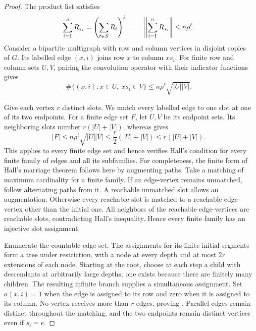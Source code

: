 \begin{proof}
The product list satisfies
\[
 \sum_{i=1}^nR_{s_i}=\left(\sum_{t\in S}R_t\right)^\ell,
 \qquad
 \left\lVert\sum_{i=1}^nR_{s_i}\right\rVert\le n\rho^\ell.
\]
Consider a bipartite multigraph with row and column vertices in
disjoint copies of \(G\). Its labelled edge \((x,i)\) joins row \(x\)
to column \(xs_i\). For finite row and column sets \(U,V\), pairing
the convolution operator with their indicator functions gives
\begin{equation}\label{eq:edge-count}
 \#\{(x,i):x\in U,\ xs_i\in V\}
 \le n\rho^\ell\sqrt{|U||V|}.
\end{equation}

Give each vertex \(r\) distinct slots. We match every labelled edge to
one slot at one of its two endpoints. For a finite edge set \(F\), let
\(U,V\) be its endpoint sets. Its neighboring slots number
\(r(|U|+|V|)\), whereas  gives
\[
 |F|\le n\rho^\ell\sqrt{|U||V|}
 \le\frac r2(|U|+|V|)\le r(|U|+|V|).
\]
This applies to every finite edge set and hence verifies Hall's
condition for every finite family of edges and all its subfamilies.
For completeness, the finite form of Hall's marriage theorem
\cite{Hall1935} follows here by augmenting paths. Take a matching of maximum
cardinality for a finite family. If an edge-vertex remains unmatched,
follow alternating paths from it. A reachable unmatched slot allows
an augmentation. Otherwise every reachable slot is matched to a
reachable edge-vertex other than the initial one. All neighbors of the
reachable edge-vertices are reachable slots, contradicting Hall's
inequality. Hence every finite family has an injective slot assignment.

Enumerate the countable edge set. The assignments for its finite
initial segments form a tree under restriction, with a node at every
depth and at most \(2r\) extensions of each node. Starting at the root,
choose at each step a child with descendants at arbitrarily large
depths; one exists because there are finitely many children. The
resulting infinite branch supplies a simultaneous assignment. Set \(a(x,i)=1\) when the edge is assigned to
its row and zero when it is assigned to its column. No vertex receives
more than \(r\) edges, proving . Parallel edges
remain distinct throughout the matching, and the two endpoints remain
distinct vertices even if \(s_i=e\).
\end{proof}
